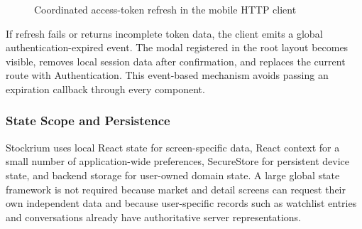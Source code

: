 \begin{figure}[H]
{%
    }
    \caption{Coordinated access-token refresh in the mobile HTTP client}
    \label{fig:mobile-token-refresh-flow}
\end{figure}

If refresh fails or returns incomplete token data, the client emits a global authentication-expired event. The modal registered in the root layout becomes visible, removes local session data after confirmation, and replaces the current route with Authentication. This event-based mechanism avoids passing an expiration callback through every component.

\subsubsection{State Scope and Persistence}

Stockrium uses local React state for screen-specific data, React context for a small number of application-wide preferences, SecureStore for persistent device state, and backend storage for user-owned domain state. A large global state framework is not required because market and detail screens can request their own independent data and because user-specific records such as watchlist entries and conversations already have authoritative server representations.

